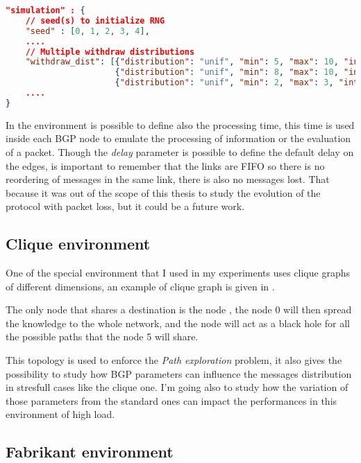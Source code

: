\begin{lstlisting}[language=json, caption=Environment example, label=lst:environment_example]
"simulation" : {                                                              
    // seed(s) to initialize RNG                                      
    "seed" : [0, 1, 2, 3, 4], 
    ....
    // Multiple withdraw distributions
    "withdraw_dist": [{"distribution": "unif", "min": 5, "max": 10, "int": 0.1},
                      {"distribution": "unif", "min": 8, "max": 10, "int": 0.1},
                      {"distribution": "unif", "min": 2, "max": 3, "int": 0.1}],       
    ....
}
\end{lstlisting}

In the environment is possible to define also the processing time, this time is used
inside each \ac{BGP} node to emulate the processing of information or the evaluation
of a packet.
Though the \textit{delay} parameter is possible to define the default delay on the edges,
is important to remember that the links are FIFO so there is no reordering
of messages in the same link, there is also no messages lost.
That because it was out of the scope of this thesis to study the evolution
of the protocol with packet loss, but it could be a future work.

\subsection{Clique environment}
\label{subsec:clique_env}

One of the special environment that I used in my experiments uses clique 
graphs of different dimensions, an example of clique graph is given in
.

The only node that shares a destination is the node , the node
\num{0} will then spread the knowledge to the whole network, and the node 
 will act as a black hole for all the possible paths
that the node \num{5} will share.

This topology is used to enforce the \textit{Path exploration} problem, it also
gives the possibility to study how \ac{BGP} parameters can influence the messages
distribution in stresfull cases like the clique one.
I'm going also to study how the variation of those parameters from the standard
ones can impact the performances in this environment of high load.

\subsection{Fabrikant environment}
\label{subsec:fabrikant_env}

